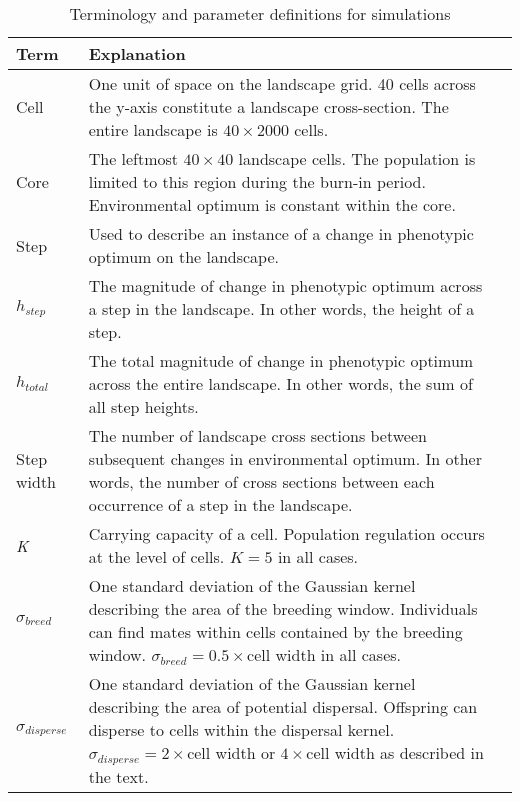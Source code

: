 

\begin{table}[h]
\centering \footnotesize
\caption{Terminology and parameter definitions for simulations}
\label{tab:params}
\begin{tabular}{lp{}l}
Term		& Explanation  \\ \hline \hline
Cell		& One unit of space on the landscape grid. 40 cells across the y-axis constitute a landscape cross-section. The entire landscape is $40\times2000$ cells.			\\ \hline
Core		& The leftmost $40\times40$ landscape cells. The population is limited to this region during the burn-in period. Environmental optimum is constant within the core.	\\ \hline
Step		& Used to describe an instance of a change in phenotypic optimum on the landscape.															\\ \hline
$h_{step}$ & The magnitude of change in phenotypic optimum across a step in the landscape. In other words, the height of a step.									\\ \hline
$h_{total}$ & The total magnitude of change in phenotypic optimum across the entire landscape. In other words, the sum of all step heights.							\\ \hline
Step width	& The number of landscape cross sections between subsequent changes in environmental optimum. In other words, the number of cross sections between each occurrence of a step in the landscape.	\\ \hline
\emph{K}	& Carrying capacity of a cell. Population regulation occurs at the level of cells. $K = 5$ in all cases.													\\ \hline
$\sigma_{breed}$ & One standard deviation of the Gaussian kernel describing the area of the breeding window. Individuals can find mates within cells contained by the breeding window. $\sigma_{breed} = 0.5\times$cell width in all cases. \\ \hline
$\sigma_{disperse}$ & One standard deviation of the Gaussian kernel describing the area of potential dispersal. Offspring can disperse to cells within the dispersal kernel. $\sigma_{disperse} = 2\times$cell width or $4\times$cell width as described in the text.                                          
\end{tabular}
\end{table}









